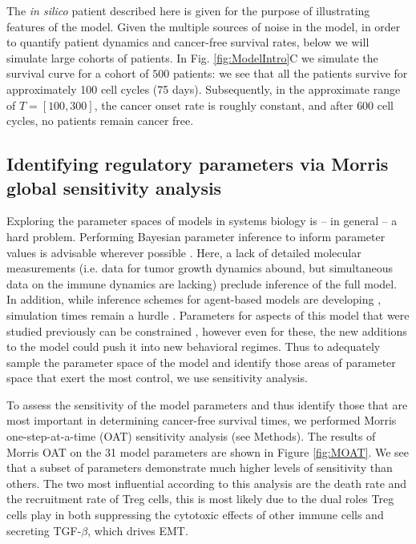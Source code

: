 \documentclass[11pt]{article}
\begin{document}
\par 
The {\em in silico} patient described here is given for the purpose of illustrating features of the model. Given the multiple sources of noise in the model, in order to quantify patient dynamics and cancer-free survival rates, below we will simulate large cohorts of patients. In Fig. \ref{fig:ModelIntro}C we simulate the survival curve for a cohort of $500$ patients: we see that all the patients survive for approximately 100 cell cycles (75 days). Subsequently, in the approximate range of $T= [100,300]$, the cancer onset rate is roughly constant, and after $600$ cell cycles, no patients remain cancer free.


\subsection{Identifying regulatory parameters via Morris global sensitivity analysis}\label{SensAnalysis}
Exploring the parameter spaces of models in systems biology is -- in general -- a hard problem. Performing Bayesian parameter inference to inform parameter values is advisable wherever possible \cite{kirk13_model}. Here, a lack of detailed molecular measurements  (i.e. data for tumor growth dynamics abound, but simultaneous data on the immune dynamics are lacking) preclude inference of the full model. In addition, while inference schemes for agent-based models are developing \cite{gallaher17_hybrid, warne19_simulation}, simulation times remain a hurdle \cite{lambert18_bayesian}. Parameters for aspects of this model that were studied previously can be constrained \cite{guo17_multiscale}, however even for these, the new additions to the model could push it into new behavioral regimes. Thus to adequately sample the parameter space of the model and identify those areas of parameter space that exert the most control, we use sensitivity analysis.   
\par
To assess the sensitivity of the model parameters and thus identify those that are most important in determining cancer-free survival times, we performed Morris one-step-at-a-time (OAT) sensitivity analysis (see Methods). 
The results of Morris OAT on the 31 model parameters are shown in Figure \ref{fig:MOAT}. We see that a subset of parameters demonstrate much higher levels of sensitivity than others.
The two most influential according to this analysis are the death rate and the recruitment rate of Treg cells, this is most likely due to the dual roles Treg cells play in both suppressing the cytotoxic effects of other immune cells and secreting TGF-$\beta$, which drives EMT.
\end{document}
